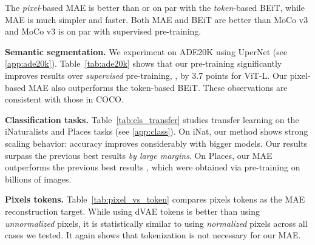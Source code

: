 \documentclass[10pt,twocolumn,letterpaper]{article}
\renewcommand{\paragraph}[1]{\vspace{1.25mm}\noindent\textbf{#1}}
\begin{document}
The \textit{pixel}-based MAE is better than or on par with the \textit{token}-based BEiT, while MAE is much simpler and faster. Both MAE and BEiT are better than MoCo v3 and MoCo v3 is on par with supervised pre-training.

\paragraph{Semantic segmentation.} We experiment on ADE20K \cite{Zhou2019} using UperNet \cite{Xiao2018} (see \ref{app:ade20k}). Table~\ref{tab:ade20k} shows that our pre-training significantly improves results over \textit{supervised} pre-training, \eg, by 3.7 points for ViT-L. Our pixel-based MAE also outperforms the token-based BEiT. These observations are consistent with those in COCO.

\paragraph{Classification tasks.} \mbox{Table~\ref{tab:cls_transfer}} studies transfer learning on the iNaturalists \cite{VanHorn2018} and Places \cite{Zhou2014} tasks (see \ref{app:class}). On iNat, our method shows strong scaling behavior: accuracy improves considerably with bigger models. Our results surpass the previous best results \textit{by large margins}. On Places, our MAE outperforms the previous best results \cite{Goyal2021,Mahajan2018}, which were obtained via pre-training on billions of images.

\paragraph{Pixels \vs tokens.} Table~\ref{tab:pixel_vs_token} compares pixels \vs tokens as the MAE reconstruction target. While using dVAE tokens is better than using \textit{unnormalized} pixels, it is statistically similar to using \textit{normalized} pixels across all cases we tested. It again shows that tokenization is not necessary for our MAE.
\end{document}
